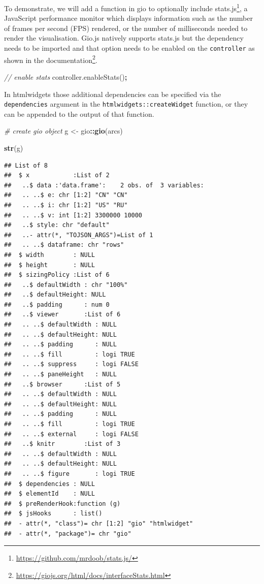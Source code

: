 \documentclass[
]{krantz}
\makeatletter
\newenvironment{Shaded}{\begin{snugshade}}{\end{snugshade}}
\newcommand{\AttributeTok}[1]{\textcolor[rgb]{0.61,0.61,0.61}{#1}}
\newcommand{\CommentTok}[1]{\textcolor[rgb]{0.37,0.37,0.37}{\textit{#1}}}
\newcommand{\KeywordTok}[1]{\textcolor[rgb]{0.27,0.27,0.27}{\textbf{#1}}}
\newcommand{\NormalTok}[1]{#1}
\newcommand{\OperatorTok}[1]{\textcolor[rgb]{0.43,0.43,0.43}{\textbf{#1}}}
\newcommand{\StringTok}[1]{\textcolor[rgb]{0.5,0.5,0.5}{#1}}
\newcommand{\VariableTok}[1]{\textcolor[rgb]{0,0,0}{#1}}
\renewcommand{\href}[2]{#2\footnote{\url{#1}}}
\newenvironment{kframe}{%
\medskip{}
\setlength{\fboxsep}{.8em}
 \def\at@end@of@kframe{}%
 \ifinner\ifhmode%
  \def\at@end@of@kframe{\end{minipage}}%
  \begin{minipage}{\columnwidth}%
 \fi\fi%
 \def\FrameCommand##1{\hskip\@totalleftmargin \hskip-\fboxsep
 \colorbox{shadecolor}{##1}\hskip-\fboxsep
     \hskip-\linewidth \hskip-\@totalleftmargin \hskip\columnwidth}%
 \MakeFramed {\advance\hsize-\width
   \@totalleftmargin\z@ \linewidth\hsize
   \@setminipage}}%
 {\par\unskip\endMakeFramed%
 \at@end@of@kframe}
\renewenvironment{Shaded}{\begin{kframe}}{\end{kframe}}
\makeatother
\begin{document}
To demonstrate, we will add a function in gio to optionally include \href{https://github.com/mrdoob/stats.js/}{stats.js}, a JavaScript performance monitor which displays information such as the number of frames per second (FPS) rendered, or the number of milliseconds needed to render the visualisation. Gio.js natively supports stats.js but the dependency needs to be imported and that option needs to be enabled on the \texttt{controller} as shown in the \href{https://giojs.org/html/docs/interfaceStats.html}{documentation}.

\begin{Shaded}
\begin{Highlighting}[]
\CommentTok{// enable stats}
\VariableTok{controller}\NormalTok{.}\AttributeTok{enableStats}\NormalTok{()}\OperatorTok{;}
\end{Highlighting}
\end{Shaded}

In htmlwidgets those additional dependencies can be specified via the \texttt{dependencies} argument in the \texttt{htmlwidgets::createWidget} function, or they can be appended to the output of that function.

\begin{Shaded}
\begin{Highlighting}[]
\CommentTok{\# create gio object}
\NormalTok{g <{-}}\StringTok{ }\NormalTok{gio}\OperatorTok{::}\KeywordTok{gio}\NormalTok{(arcs)}

\KeywordTok{str}\NormalTok{(g)}
\end{Highlighting}
\end{Shaded}

\begin{verbatim}
## List of 8
##  $ x            :List of 2
##   ..$ data :'data.frame':	2 obs. of  3 variables:
##   .. ..$ e: chr [1:2] "CN" "CN"
##   .. ..$ i: chr [1:2] "US" "RU"
##   .. ..$ v: int [1:2] 3300000 10000
##   ..$ style: chr "default"
##   ..- attr(*, "TOJSON_ARGS")=List of 1
##   .. ..$ dataframe: chr "rows"
##  $ width        : NULL
##  $ height       : NULL
##  $ sizingPolicy :List of 6
##   ..$ defaultWidth : chr "100%"
##   ..$ defaultHeight: NULL
##   ..$ padding      : num 0
##   ..$ viewer       :List of 6
##   .. ..$ defaultWidth : NULL
##   .. ..$ defaultHeight: NULL
##   .. ..$ padding      : NULL
##   .. ..$ fill         : logi TRUE
##   .. ..$ suppress     : logi FALSE
##   .. ..$ paneHeight   : NULL
##   ..$ browser      :List of 5
##   .. ..$ defaultWidth : NULL
##   .. ..$ defaultHeight: NULL
##   .. ..$ padding      : NULL
##   .. ..$ fill         : logi TRUE
##   .. ..$ external     : logi FALSE
##   ..$ knitr        :List of 3
##   .. ..$ defaultWidth : NULL
##   .. ..$ defaultHeight: NULL
##   .. ..$ figure       : logi TRUE
##  $ dependencies : NULL
##  $ elementId    : NULL
##  $ preRenderHook:function (g)  
##  $ jsHooks      : list()
##  - attr(*, "class")= chr [1:2] "gio" "htmlwidget"
##  - attr(*, "package")= chr "gio"
\end{verbatim}
\end{document}
